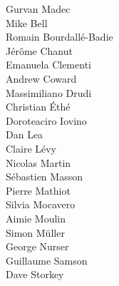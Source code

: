 
 Gurvan Madec                \\
                            Mike Bell                   \\
 Romain Bourdall\'{e}-Badie  \\
                            J\'{e}r\^{o}me Chanut       \\
 Emanuela Clementi           \\
 Andrew Coward               \\
                            Massimiliano Drudi          \\
                            Christian \'{E}th\'{e}      \\
 Doroteaciro Iovino          \\
                            Dan Lea                     \\
 Claire L\'{e}vy             \\
                            Nicolas Martin              \\
 S\'{e}bastien Masson        \\
                            Pierre Mathiot              \\
 Silvia Mocavero             \\
                            Aimie Moulin                \\
                            Simon M\"{u}ller            \\
                            George Nurser               \\
 Guillaume Samson            \\
                            Dave Storkey                \\
